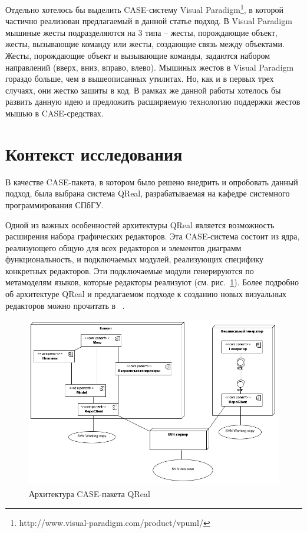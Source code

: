 \documentclass[a5paper]{article}
\begin{document}
Отдельно хотелось бы выделить CASE-систему Visual Paradigm\footnote{http://www.visual-paradigm.com/product/vpuml/}, в которой частично реализован 
предлагаемый в данной статье подход. 
В Visual Paradigm мышиные жесты подразделяются на 3 типа – жесты, порождающие объект, жесты, вызывающие команду или жесты, 
создающие связь между объектами. Жесты, порождающие объект и вызывающие команды, задаются набором направлений (вверх, вниз, вправо, влево). 
Мышиных жестов в Visual Paradigm гораздо больше, чем в вышеописанных утилитах. Но, как и в первых трех случаях, они жестко
зашиты в код. В рамках же данной работы хотелось бы развить данную идею и предложить расширяемую технологию поддержки
жестов мышью в CASE-средствах.



\section{Контекст исследования}
В качестве CASE-пакета, в котором было решено внедрить и опробовать данный подход, была выбрана система QReal, разрабатываемая на кафедре 
системного программирования СПбГУ. 

Одной из важных особенностей архитектуры QReal является возможность расширения набора графических редакторов. Эта CASE-система состоит 
из ядра, реализующего общую для всех редакторов и элементов диаграмм функциональность, и подключаемых модулей, реализующих специфику 
конкретных редакторов. Эти подключаемые модули генерируются по метамоделям языков, которые редакторы реализуют (см. рис.~\ref{architecture}). 
Более подробно об архитектуре QReal и предлагаемом подходе к  созданию новых визуальных редакторов можно прочитать в ~\cite{qrealBasic}. 

\begin{figure} [ht]
  \begin{center}
    \includegraphics[width=1\textwidth, bb=0 0 798 531]{01-architecture.png}
    \caption{Архитектура CASE-пакета QReal}
    \label{architecture}
  \end{center}
\end{figure}
\end{document}
